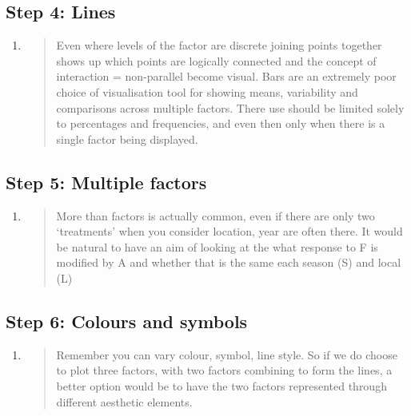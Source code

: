 \documentclass[
  titlepage]{book}
\begin{document}
\hypertarget{step-4-lines}{%
\subsection{Step 4: Lines}\label{step-4-lines}}

\begin{enumerate}
\def\labelenumi{\alph{enumi}.}
\item
  \begin{quote}
  Even where levels of the factor are discrete joining points together shows up which points are logically connected and the concept of interaction = non-parallel become visual. Bars are an extremely poor choice of visualisation tool for showing means, variability and comparisons across multiple factors. There use should be limited solely to percentages and frequencies, and even then only when there is a single factor being displayed.
  \end{quote}
\end{enumerate}

\hypertarget{step-5-multiple-factors}{%
\subsection{Step 5: Multiple factors}\label{step-5-multiple-factors}}

\begin{enumerate}
\def\labelenumi{\alph{enumi}.}
\item
  \begin{quote}
  More than factors is actually common, even if there are only two `treatments' when you consider location, year are often there. It would be natural to have an aim of looking at the what response to F is modified by A and whether that is the same each season (S) and local (L)
  \end{quote}
\end{enumerate}

\hypertarget{step-6-colours-and-symbols}{%
\subsection{Step 6: Colours and symbols}\label{step-6-colours-and-symbols}}

\begin{enumerate}
\def\labelenumi{\alph{enumi}.}
\item
  \begin{quote}
  Remember you can vary colour, symbol, line style. So if we do choose to plot three factors, with two factors combining to form the lines, a better option would be to have the two factors represented through different aesthetic elements.
  \end{quote}
\end{enumerate}
\end{document}
